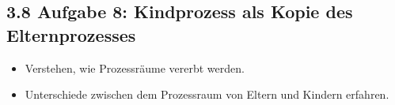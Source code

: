 \documentclass[a4paper,10pt,english]{report}
\begin{document}
\subsection{3.8 Aufgabe 8: Kindprozess als Kopie des Elternprozesses}
\label{\detokenize{P07_Prozesse_und_Threads/README:aufgabe-8-kindprozess-als-kopie-des-elternprozesses}}
\sphinxAtStartPar
{}
\begin{itemize}
\item {} 
\sphinxAtStartPar
Verstehen, wie Prozessräume vererbt werden.

\item {} 
\sphinxAtStartPar
Unterschiede zwischen dem Prozessraum von Eltern und Kindern erfahren.

\end{itemize}

\sphinxAtStartPar
{}
\end{document}
